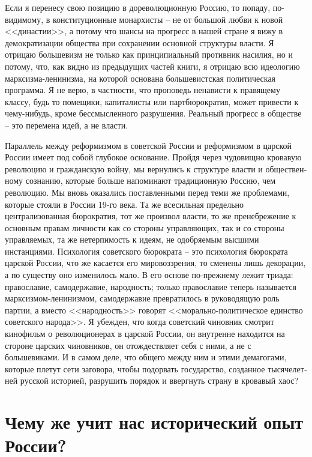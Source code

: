 \documentclass{book}
\begin{document}
Если я перенесу свою позицию в дореволюционную Россию, то попаду, по-видимому, в конституционные монархисты -- не от большой любви к новой <<династии>>, а потому что шансы на прогресс в нашей стране я вижу в демократизации общества при сохранении основной структуры власти. Я отрицаю больше­визм не только как принципиальный противник насилия, но и потому, что, как видно из предыдущих частей книги, я отрицаю всю идеологию марксизма-ленинизма, на которой основана большевистская политическая программа. Я не верю, в частно­сти, что проповедь ненависти к правящему классу, будь то поме­щики, капиталисты или партбюрократия, может привести к че­му-нибудь, кроме бессмысленного разрушения. Реальный про­гресс в обществе -- это перемена идей, а не власти.

Параллель между реформизмом в советской России и ре­формизмом в царской России имеет под собой глубокое осно­вание. Пройдя через чудовищно кровавую революцию и граж­данскую войну, мы вернулись к структуре власти и обществен­ному сознанию, которые больше напоминают традиционную Россию, чем революцию. Мы вновь оказались поставленными перед теми же проблемами, которые стояли в России 19-го ве­ка. Та же всесильная предельно централизованная бюрокра­тия, тот же произвол власти, то же пренебрежение к основным правам личности как со стороны управляющих, так и со сторо­ны управляемых, та же нетерпимость к идеям, не одобряемым высшими инстанциями. Психология советского бюрократа -- это психология бюрократа царской России, что же касается его мировоззрения, то сменены лишь декорации, а по сущест­ву оно изменилось мало. В его основе по-прежнему лежит три­ада: православие, самодержавие, народность; только правосла­вие теперь называется марксизмом-ленинизмом, самодержа­вие превратилось в руководящую роль партии, а вместо 
<<на­родность>> говорят <<морально-политическое единство совет­ского народа>>. Я убежден, что когда советский чиновник смот­рит кинофильм о революционерах в царской России, он внут­ренне находится на стороне царских чиновников, он отожде­ствляет себя с ними, а не с большевиками. И в самом деле, что общего между ним и этими демагогами, которые плетут сети заговора, чтобы подорвать государство, созданное тысячелет­ней русской историей, разрушить порядок и ввергнуть страну в кровавый хаос?


\section{Чему же учит нас исторический опыт России?}
\end{document}
